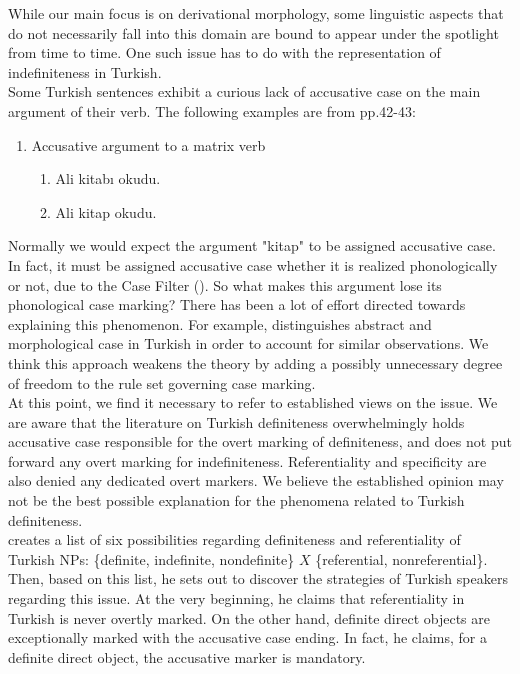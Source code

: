\documentclass[11pt]{article} %
\begin{document}
\label{IndefTR}

While our main focus is on derivational morphology, some linguistic aspects that do not necessarily fall into this domain are bound to appear under the spotlight from time to time. One such issue has to do with the representation of indefiniteness in Turkish. \\

Some Turkish sentences exhibit a curious lack of accusative case on the main argument of their verb. The following examples are from \citet{Sezer1991} pp.42-43: 

\begin{enumerate}[resume*] 
	\item Accusative argument to a matrix verb
	\begin{enumerate}[label=(\alph*), ref=(\alph*)]\itemsep1pt
	\item Ali kitabı okudu.
	\item Ali kitap okudu. 
	\end{enumerate}
\end{enumerate}

Normally we would expect the argument "kitap" to be assigned accusative case. In fact, it must be assigned accusative case whether it is realized phonologically or not, due to the Case Filter (\citet{Cowper1992}). So what makes this argument lose its phonological case marking? There has been a lot of effort directed towards explaining this phenomenon. For example, \citet{Sezer1991} distinguishes abstract and morphological case in Turkish in order to account for similar observations. We think this approach weakens the theory by adding a possibly unnecessary degree of freedom to the rule set governing case marking. \\

At this point, we find it necessary to refer to established views on the issue. We are aware that the literature on Turkish definiteness overwhelmingly holds accusative case responsible for the overt marking of definiteness, and does not put forward any overt marking for indefiniteness. Referentiality and specificity are also denied any dedicated overt markers. We believe the established opinion may not be the best possible explanation for the phenomena related to Turkish definiteness. \\

\citet{Dede1986} creates a list of six possibilities regarding definiteness and referentiality of Turkish NPs: \{definite, indefinite, nondefinite\} $X$ \{referential, nonreferential\}. Then, based on this list, he sets out to discover the strategies of Turkish speakers regarding this issue. At the very beginning, he claims that referentiality in Turkish is never overtly marked. On the other hand, definite direct objects are exceptionally marked with the accusative case ending. In fact, he claims, for a definite direct object, the accusative marker is mandatory.  \\
\end{document}
